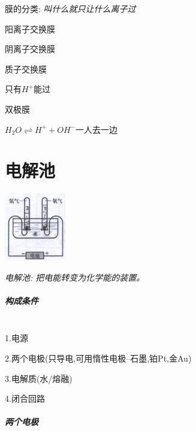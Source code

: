 \documentclass[10pt,cn]{elegantbook}
\begin{document}
膜的分类:
 \textit{叫什么就只让什么离子过}

阳离子交换膜%

阴离子交换膜

质子交换膜

只有$H^{+}$能过

双极膜

$H_{2}O\rightleftharpoons H^{+}+OH^{-}$一人去一边

\chapter{电解池}


\begin{center}
	\includegraphics[max width=0.2\textwidth]{image/c19.jpg}
\end{center}



\textit{电解池: 把电能转变为化学能的装置。}

\paragraph*{构成条件}~{}\\

1.电源

2.两个电极(只导电,可用惰性电极--石墨,铂Pt,金Au)

3.电解质(水/熔融)

4.闭合回路

\paragraph*{两个电极}~{}\\
\end{document}
